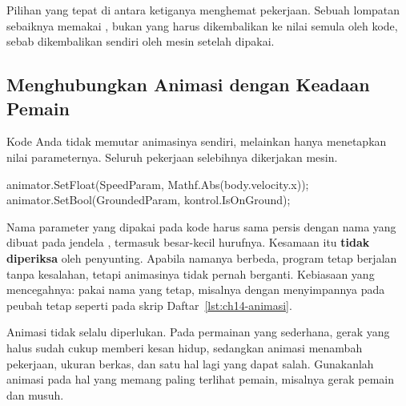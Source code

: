 Pilihan yang tepat di antara ketiganya menghemat pekerjaan. Sebuah lompatan
sebaiknya memakai , bukan  yang harus
dikembalikan ke nilai semula oleh kode, sebab  dikembalikan
sendiri oleh mesin setelah dipakai.

\subsection{Menghubungkan Animasi dengan Keadaan Pemain}

Kode Anda tidak memutar animasinya sendiri, melainkan hanya menetapkan nilai
parameternya. Seluruh pekerjaan selebihnya dikerjakan mesin.

\begin{kodekeluaran}
animator.SetFloat(SpeedParam, Mathf.Abs(body.velocity.x));
animator.SetBool(GroundedParam, kontrol.IsOnGround);
\end{kodekeluaran}

\begin{peringatanbox}
Nama parameter yang dipakai pada kode harus sama persis dengan nama yang
dibuat pada jendela , termasuk besar-kecil hurufnya.
Kesamaan itu \textbf{tidak diperiksa} oleh penyunting. Apabila namanya berbeda,
program tetap berjalan tanpa kesalahan, tetapi animasinya tidak pernah
berganti. Kebiasaan yang mencegahnya: pakai nama yang tetap, misalnya dengan
menyimpannya pada peubah tetap seperti pada skrip Daftar~\ref{lst:ch14-animasi}.
\end{peringatanbox}

\begin{tipsbox}
Animasi tidak selalu diperlukan. Pada permainan yang sederhana, gerak yang
halus sudah cukup memberi kesan hidup, sedangkan animasi menambah pekerjaan,
ukuran berkas, dan satu hal lagi yang dapat salah. Gunakanlah animasi pada hal
yang memang paling terlihat pemain, misalnya gerak pemain dan musuh.
\end{tipsbox}
